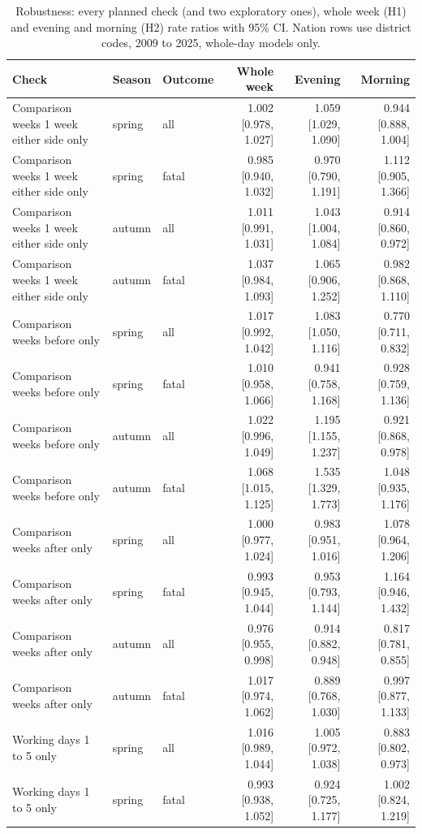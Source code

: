 \documentclass[11pt,a4paper]{article}
\begin{document}
{\scriptsize\setlength{\tabcolsep}{3pt}\begin{longtable}{p{5.6cm}llrrr}\caption{Robustness: every planned check (and two exploratory ones), whole week (H1) and evening and morning (H2) rate ratios with 95\% CI. Nation rows use district codes, 2009 to 2025, whole-day models only.}\label{tab:robust}\\\toprule Check & Season & Outcome & Whole week & Evening & Morning\\\midrule\endhead
Comparison weeks 1 week either side only & spring & all & 1.002 [0.978, 1.027] & 1.059 [1.029, 1.090] & 0.944 [0.888, 1.004]\\
Comparison weeks 1 week either side only & spring & fatal & 0.985 [0.940, 1.032] & 0.970 [0.790, 1.191] & 1.112 [0.905, 1.366]\\
Comparison weeks 1 week either side only & autumn & all & 1.011 [0.991, 1.031] & 1.043 [1.004, 1.084] & 0.914 [0.860, 0.972]\\
Comparison weeks 1 week either side only & autumn & fatal & 1.037 [0.984, 1.093] & 1.065 [0.906, 1.252] & 0.982 [0.868, 1.110]\\
Comparison weeks before only & spring & all & 1.017 [0.992, 1.042] & 1.083 [1.050, 1.116] & 0.770 [0.711, 0.832]\\
Comparison weeks before only & spring & fatal & 1.010 [0.958, 1.066] & 0.941 [0.758, 1.168] & 0.928 [0.759, 1.136]\\
Comparison weeks before only & autumn & all & 1.022 [0.996, 1.049] & 1.195 [1.155, 1.237] & 0.921 [0.868, 0.978]\\
Comparison weeks before only & autumn & fatal & 1.068 [1.015, 1.125] & 1.535 [1.329, 1.773] & 1.048 [0.935, 1.176]\\
Comparison weeks after only & spring & all & 1.000 [0.977, 1.024] & 0.983 [0.951, 1.016] & 1.078 [0.964, 1.206]\\
Comparison weeks after only & spring & fatal & 0.993 [0.945, 1.044] & 0.953 [0.793, 1.144] & 1.164 [0.946, 1.432]\\
Comparison weeks after only & autumn & all & 0.976 [0.955, 0.998] & 0.914 [0.882, 0.948] & 0.817 [0.781, 0.855]\\
Comparison weeks after only & autumn & fatal & 1.017 [0.974, 1.062] & 0.889 [0.768, 1.030] & 0.997 [0.877, 1.133]\\
Working days 1 to 5 only & spring & all & 1.016 [0.989, 1.044] & 1.005 [0.972, 1.038] & 0.883 [0.802, 0.973]\\
Working days 1 to 5 only & spring & fatal & 0.993 [0.938, 1.052] & 0.924 [0.725, 1.177] & 1.002 [0.824, 1.219]\\

\end{longtable}}
\end{document}

